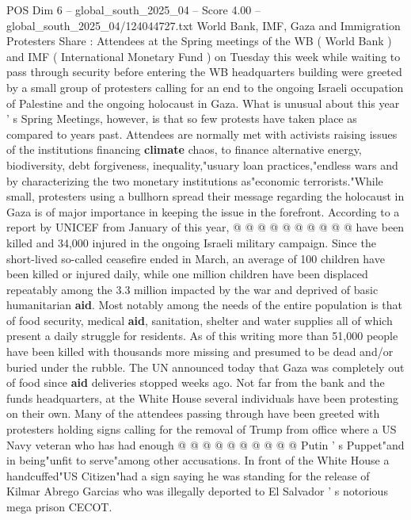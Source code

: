 \begin{textsample}{POS Dim 6 – global\_south\_2025\_04 – Score 4.00 – global\_south\_2025\_04/124044727.txt}  \label{ex:f6_pos_240}
World Bank, IMF, Gaza and Immigration Protesters Share : Attendees at the Spring meetings of the WB ( World Bank ) and IMF ( International Monetary Fund ) on Tuesday this week while waiting to pass through security before entering the WB headquarters building were greeted by a small group of protesters calling for an end to the ongoing Israeli occupation of Palestine and the ongoing holocaust in Gaza.
What is unusual about this year ' s Spring Meetings, however, is that so few protests have taken place as compared to years past.
Attendees are normally met with activists raising issues of the institutions financing \textbf{climate} chaos, to finance alternative energy, biodiversity, debt forgiveness, inequality,"usuary loan practices,"endless wars and by characterizing the two monetary institutions as"economic terrorists."While small, protesters using a bullhorn spread their message regarding the holocaust in Gaza is of major importance in keeping the issue in the forefront.
According to a report by UNICEF from January of this year, @ @ @ @ @ @ @ @ @ @ have been killed and 34,000 injured in the ongoing Israeli military campaign.
Since the short-lived so-called ceasefire ended in March, an average of 100 children have been killed or injured daily, while one million children have been displaced repeatably among the 3.3 million impacted by the war and deprived of basic humanitarian \textbf{aid}.
Most notably among the needs of the entire population is that of food security, medical \textbf{aid}, sanitation, shelter and water supplies all of which present a daily struggle for residents.
As of this writing more than 51,000 people have been killed with thousands more missing and presumed to be dead and/or buried under the rubble.
The UN announced today that Gaza was completely out of food since \textbf{aid} deliveries stopped weeks ago.
Not far from the bank and the funds headquarters, at the White House several individuals have been protesting on their own.
Many of the attendees passing through have been greeted with protesters holding signs calling for the removal of Trump from office where a US Navy veteran who has had enough @ @ @ @ @ @ @ @ @ @ Putin ' s Puppet"and in being"unfit to serve"among other accusations.
In front of the White House a handcuffed"US Citizen"had a sign saying he was standing for the release of Kilmar Abrego Garcias who was illegally deported to El Salvador ' s notorious mega prison CECOT.

\end{textsample}
